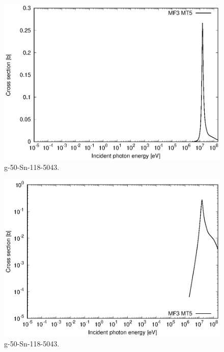 \begin{figure}
 \includegraphics[width=\linewidth]{eps/g_50-Sn-118_5043.eps}
  \caption{g-50-Sn-118-5043.}
\end{figure}
\begin{figure}
 \includegraphics[width=\linewidth]{eps-log/g_50-Sn-118_5043.eps}
 \caption{g-50-Sn-118-5043.}
\end{figure}
\newpage \clearpage

